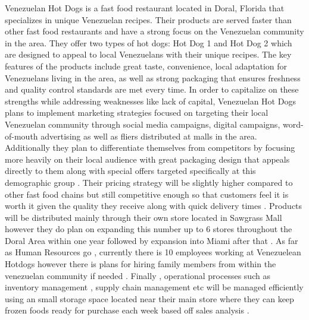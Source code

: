 

Venezuelan Hot Dogs is a fast food restaurant located in Doral, Florida that specializes in unique Venezuelan recipes. Their products are served faster than other fast food restaurants and have a strong focus on the Venezuelan community in the area. They offer two types of hot dogs: Hot Dog 1 and Hot Dog 2 which are designed to appeal to local Venezuelans with their unique recipes. The key features of the products include great taste, convenience, local adaptation for Venezuelans living in the area, as well as strong packaging that ensures freshness and quality control standards are met every time. In order to capitalize on these strengths while addressing weaknesses like lack of capital, Venezuelan Hot Dogs plans to implement marketing strategies focused on targeting their local Venezuelan community through social media campaigns, digital campaigns, word-of-mouth advertising as well as fliers distributed at malls in the area. Additionally they plan to differentiate themselves from competitors by focusing more heavily on their local audience with great packaging design that appeals directly to them along with special offers targeted specifically at this demographic group .  Their pricing strategy will be slightly higher compared to other fast food chains but still competitive enough so that customers feel it is worth it given the quality they receive along with quick delivery times . Products will be distributed mainly through their own store located in Sawgrass Mall however they do plan on expanding this number up to 6 stores throughout the Doral Area within one year followed by expansion into Miami after that . As far as Human Resources go , currently there is 10 employees working at Venezuelean Hotdogs however there is plans for hiring family members from within the venezuelan community if needed . Finally , operational processes such as inventory management , supply chain management etc will be managed efficiently using an small storage space located near their main store where they can keep frozen foods ready for purchase each week based off sales analysis .